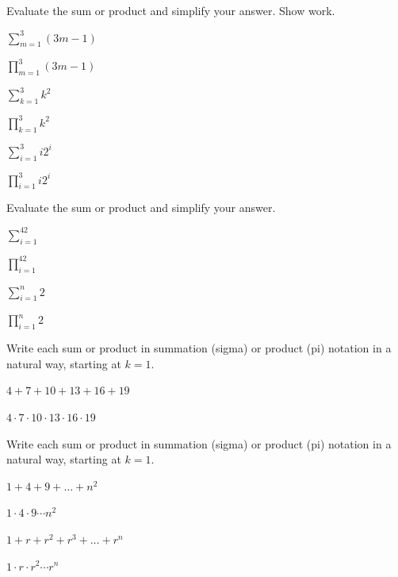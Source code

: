 \begin{exer}[\exerP] %
\label{exer_eval_sigma_pi}
    Evaluate the sum or product and simplify your answer. Show work.
        \begin{exerpart}           
            \item $\displaystyle \sum_{m=1}^3(3m-1)$
            \item $\displaystyle \prod_{m=1}^3(3m-1)$
            \item $\displaystyle \sum_{k=1}^3 k^2$
            \item $\displaystyle \prod_{k=1}^3 k^2$
            \item $\displaystyle \sum_{i=1}^3i2^i$
            \item $\displaystyle \prod_{i=1}^3i2^i$
        \end{exerpart}
\end{exer}

\begin{exer}[\exerU] %
\label{exer_eval_sigma_pi_constant}
    Evaluate the sum or product and simplify your answer.
        \begin{exerpart}            
            \item $\displaystyle \sum_{i=1}^42$
            \item $\displaystyle \prod_{i=1}^42$
            \item $\displaystyle \sum_{i=1}^n2$
            \item $\displaystyle \prod_{i=1}^n2$
        \end{exerpart}
\end{exer}

\begin{exer}[\exerU] %
\label{exer_model_sigma_pi}
    Write each sum or product in summation (sigma) or product (pi) notation in a natural way, starting at $k=1$.
        \begin{exerpart}
            \item $4 +7 + 10 + 13 + 16 + 19$
            \item $4 \cdot 7 \cdot 10 \cdot 13 \cdot 16 \cdot 19$
        \end{exerpart}
\end{exer}

\begin{exer}[\exerU] %
\label{exer_model_sigma_pi_variables}
    Write each sum or product in summation (sigma) or product (pi) notation in a natural way, starting at $k=1$.  
        \begin{exerpart}
            \item $1 + 4 + 9 + \ldots + n^2$
            \item $1 \cdot 4 \cdot 9 \cdots n^2$
            \item $1 + r + r^2 + r^3 + \ldots + r^n$
            \item $1 \cdot r \cdot r^2 \cdots r^n$
        \end{exerpart}
\end{exer}

